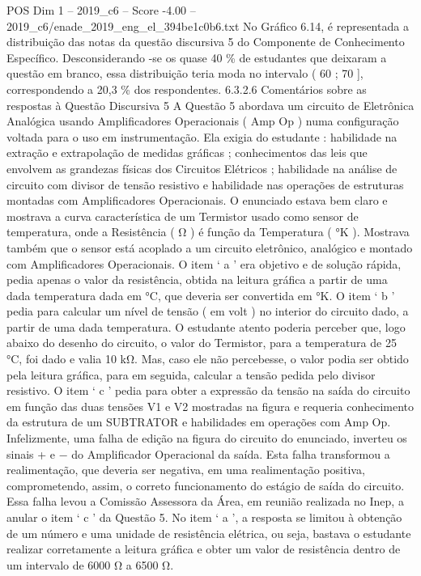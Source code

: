 \begin{textsample}{POS Dim 1 – 2019\_c6 – Score -4.00 – 2019\_c6/enade\_2019\_eng\_el\_394be1c0b6.txt}
No Gráfico 6.14, é representada a distribuição das notas da questão discursiva 5 do Componente de Conhecimento Específico.
Desconsiderando -se os quase 40 \% de estudantes que deixaram a questão em branco, essa distribuição teria moda no intervalo ( 60 ; 70 ], correspondendo a 20,3 \% dos respondentes. 6.3.2.6 Comentários sobre as respostas à Questão Discursiva 5 A Questão 5 abordava um circuito de Eletrônica Analógica usando Amplificadores Operacionais ( Amp Op ) numa configuração voltada para o uso em instrumentação.
Ela exigia do estudante : habilidade na extração e extrapolação de medidas gráficas ; conhecimentos das leis que envolvem as grandezas físicas dos Circuitos Elétricos ; habilidade na análise de circuito com divisor de tensão resistivo e habilidade nas operações de estruturas montadas com Amplificadores Operacionais.
O enunciado estava bem claro e mostrava a curva característica de um Termistor usado como sensor de temperatura, onde a Resistência ( Ω ) é função da Temperatura ( {\EmojiFont °}K ).
Mostrava também que o sensor está acoplado a um circuito eletrônico, analógico e montado com Amplificadores Operacionais.
O item ‘ a ’ era objetivo e de solução rápida, pedia apenas o valor da resistência, obtida na leitura gráfica a partir de uma dada temperatura dada em {\EmojiFont °}C, que deveria ser convertida em {\EmojiFont °}K.
O item ‘ b ’ pedia para calcular um nível de tensão ( em volt ) no interior do circuito dado, a partir de uma dada temperatura.
O estudante atento poderia perceber que, logo abaixo do desenho do circuito, o valor do Termistor, para a temperatura de 25 {\EmojiFont °}C, foi dado e valia 10 kΩ.
Mas, caso ele não percebesse, o valor podia ser obtido pela leitura gráfica, para em seguida, calcular a tensão pedida pelo divisor resistivo.
O item ‘ c ’ pedia para obter a expressão da tensão na saída do circuito em função das duas tensões V1 e V2 mostradas na figura e requeria conhecimento da estrutura de um SUBTRATOR e habilidades em operações com Amp Op.
Infelizmente, uma falha de edição na figura do circuito do enunciado, inverteu os sinais + e − do Amplificador Operacional da saída.
Esta falha transformou a realimentação, que deveria ser negativa, em uma realimentação positiva, comprometendo, assim, o correto funcionamento do estágio de saída do circuito.
Essa falha levou a Comissão Assessora da Área, em reunião realizada no Inep, a anular o item ‘ c ’ da Questão 5.
No item ‘ a ’, a resposta se limitou à obtenção de um número e uma unidade de resistência elétrica, ou seja, bastava o estudante realizar corretamente a leitura gráfica e obter um valor de resistência dentro de um intervalo de 6000 Ω a 6500 Ω.

\end{textsample}
